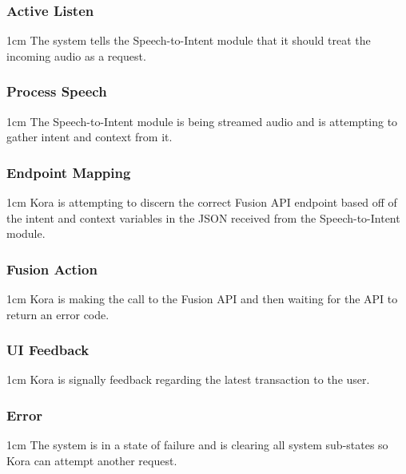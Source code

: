\documentclass[onecolumn, draftclsnofoot,10pt, compsoc]{IEEEtran}
\newenvironment{indentItem}[1][1cm]{\begin{adjustwidth}{#1}{}}{\end{adjustwidth}}
\begin{document}
	\subsubsection{Active Listen}
		\begin{indentItem}
			The system tells the Speech-to-Intent module that it should treat the incoming audio as a request.
		\end{indentItem}
	
	\subsubsection{Process Speech}
		\begin{indentItem}
			The Speech-to-Intent module is being streamed audio and is attempting to gather intent and context from it.
		\end{indentItem}
	
	\subsubsection{Endpoint Mapping}
		\begin{indentItem}
			Kora is attempting to discern the correct Fusion API endpoint based off of the intent and context variables in the JSON received from the Speech-to-Intent module.
		\end{indentItem}
		
	\subsubsection{Fusion Action}
		\begin{indentItem}
			Kora is making the call to the Fusion API and then waiting for the API to return an error code.
		\end{indentItem}
	
	\subsubsection{UI Feedback}
		\begin{indentItem}
			Kora is signally feedback regarding the latest transaction to the user.
		\end{indentItem}
	
	\subsubsection{Error}
		\begin{indentItem}
			The system is in a state of failure and is clearing all system sub-states so Kora can attempt another request.
		\end{indentItem}
	
\end{document}
